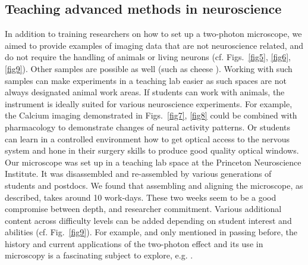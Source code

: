 \documentclass[10pt,letterpaper]{article}
\begin{document}
\subsection*{Teaching advanced methods in neuroscience}
In addition to training researchers on how to set up a two-photon microscope, we aimed to provide examples of imaging data that are not neuroscience related, and do not require the handling of animals or living neurons (cf. Figs.~\ref{fig5}, \ref{fig6}, \ref{fig9}). Other samples are possible as well (such as cheese \cite{Nguyen2001}). Working with such samples can make experiments in a teaching lab easier as such spaces are not always designated animal work areas. If students can work with animals, the instrument is ideally suited for various neuroscience experiments. For example, the Calcium imaging demonstrated in Figs.~\ref{fig7}, \ref{fig8} could be combined with pharmacology to demonstrate changes of neural activity patterns. Or students can learn in a controlled environment how to get optical access to the nervous system and hone in their surgery skills to produce good quality optical windows\cite{Holtmaat2009, Grienberger2022}.
Our microscope was set up in a teaching lab space at the Princeton Neuroscience Institute. It was disassembled and re-assembled by various generations of students and postdocs. We found that assembling and aligning the microscope, as described, takes around 10 work-days. These two weeks seem to be a good compromise between depth, and researcher commitment. Various additional content across difficulty levels can be added depending on student interest and abilities (cf. Fig.~\ref{fig9}). For example, and only mentioned in passing before, the history and current applications of the two-photon effect and its use in microscopy is a fascinating subject to explore, e.g. \cite{Sheppard2020, Yao2023}.\newline 
\end{document}
